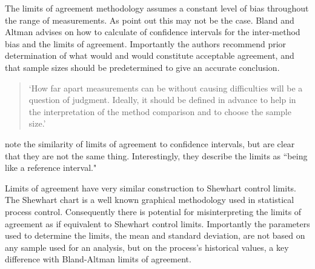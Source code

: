 \documentclass[12pt, a4paper]{report}
\theoremstyle{plain}
\theoremstyle{definition}
\theoremstyle{remark}
\begin{document}
	
	The limits of agreement methodology assumes a constant level of
	bias throughout the range of measurements. As \citet*{BA86} point
	out this may not be the case. Bland and Altman advises on how to
	calculate of confidence intervals for the inter-method bias and
	the limits of agreement. Importantly the authors recommend prior
	determination of what would and would constitute acceptable
	agreement, and that sample sizes should be predetermined to give
	an accurate conclusion.
	
	\begin{quote}
		`How far apart measurements can be without causing difficulties
		will be a question of judgment. Ideally, it should be defined in
		advance to help in the interpretation of the method comparison and
		to choose the sample size.'\citep{BA86}
	\end{quote}
	
	\citet{BA99} note the similarity of limits of agreement to
	confidence intervals, but are clear that they are not the same
	thing. Interestingly, they describe the limits as ``being like a
	reference interval."
	
	Limits of agreement have very similar construction to Shewhart
	control limits. The Shewhart chart is a well known graphical
	methodology used in statistical process control. Consequently
	there is potential for misinterpreting the limits of agreement as
	if equivalent to Shewhart control limits. Importantly the
	parameters used to determine the limits, the mean and standard
	deviation, are not based on any sample used for an analysis, but
	on the process's historical values, a key difference with
	Bland-Altman limits of agreement.
	
\end{document}
